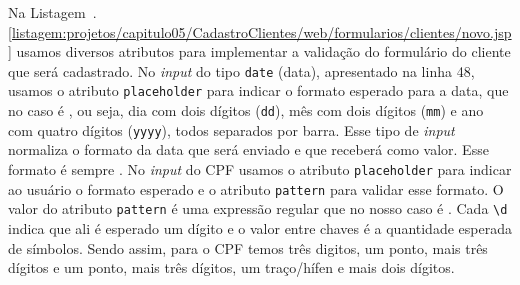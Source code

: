  
 


Na Listagem~\thechapter.\ref{listagem:projetos/capitulo05/CadastroClientes/web/formularios/clientes/novo.jsp} usamos diversos atributos para implementar a validação do formulário do cliente que será cadastrado. No \textit{input} do tipo \texttt{date} (data), apresentado na linha 48, usamos o atributo \texttt{placeholder} para indicar o formato esperado para a data, que no caso é , ou seja, dia com dois dígitos (\texttt{dd}), mês com dois dígitos (\texttt{mm}) e ano com quatro dígitos (\texttt{yyyy}), todos separados por barra. Esse tipo de \textit{input} normaliza o formato da data que será enviado e que receberá como valor. Esse formato é sempre . No \textit{input} do CPF usamos o atributo \texttt{placeholder} para indicar ao usuário o formato esperado e o atributo \texttt{pattern} para validar esse formato. O valor do atributo \texttt{pattern} é uma expressão regular que no nosso caso é . Cada \texttt{\textbackslash d} indica que ali é esperado um dígito e o valor entre chaves é a quantidade esperada de símbolos. Sendo assim, para o CPF temos três digitos, um ponto, mais três dígitos e um ponto, mais três dígitos, um traço/hífen e mais dois dígitos.


